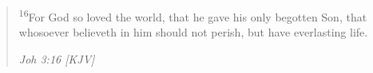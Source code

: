 \begin{quote}
\textsuperscript{16}For God so loved the world, that he gave his only begotten Son, that whosoever believeth in him should not perish, but have everlasting life.
\begin{flushright}
\emph{Joh 3:16 [KJV]}
\end{flushright}
\end{quote}
